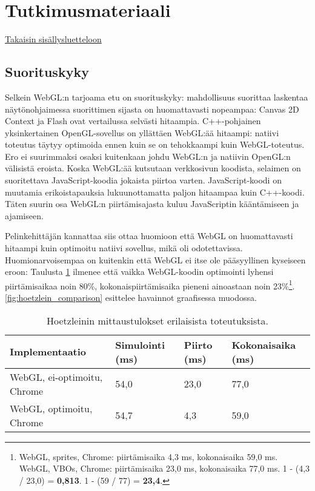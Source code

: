 \section{Tutkimusmateriaali}
\label{sec:materiaali}
\hyperlink{index}{Takaisin sisällysluetteloon}
\subsection{Suorituskyky}
Selkein WebGL:n tarjoama etu on suorituskyky: mahdollisuus suorittaa laskentaa näytönohjaimessa suorittimen sijasta on huomattavasti nopeampaa: Canvas 2D Context ja Flash ovat vertailussa selvästi hitaampia. C++-pohjainen yksinkertainen OpenGL-sovellus on yllättäen WebGL:ää hitaampi: natiivi toteutus täytyy optimoida ennen kuin se on tehokkaampi kuin WebGL-toteutus.\cite{hoetzlein} Ero ei suurimmaksi osaksi kuitenkaan johdu WebGL:n ja natiivin OpenGL:n välisistä eroista. Koska WebGL:ää kutsutaan verkkosivun koodista, selaimen on suoritettava JavaScript-koodia jokaista piirtoa varten. JavaScript-koodi on muutamia erikoistapauksia lukuunottamatta paljon hitaampaa kuin C++-koodi\cite{smedberg}. Täten suurin osa WebGL:n piirtämisajasta kuluu JavaScriptin kääntämiseen ja ajamiseen\cite{hoetzlein}.

Pelinkehittäjän kannattaa siis ottaa huomioon että WebGL on huomattavasti hitaampi kuin optimoitu natiivi sovellus, mikä oli odotettavissa. Huomionarvoisempaa on kuitenkin että WebGL ei itse ole pääsyyllinen kyseiseen eroon: Taulusta \ref{tab:hoetzlein_diff} ilmenee että vaikka WebGL-koodin optimointi lyhensi piirtämisaikaa noin 80\%, kokonaispiirtämisaika pieneni ainoastaan noin 23\%\footnote{WebGL, sprites, Chrome: piirtämisaika 4,3 ms, kokonaisaika 59,0 ms. WebGL, VBOs, Chrome: piirtämisaika 23,0 ms, kokonaisaika 77,0 ms. 1 - (4,3 / 23,0) = \textbf{0,813}. 1 - (59 / 77) = \textbf{23,4}.}. \autoref{fig:hoetzlein_comparison} esittelee havainnot graafisessa muodossa.

\begin{table}[h]
    \caption{\label{tab:hoetzlein_diff}Hoetzleinin\cite{hoetzlein} mittaustulokset erilaisista toteutuksista.}
    \begin{tabular}{|l|l|l|l|}
        \hline
        Implementaatio & Simulointi (ms) & Piirto (ms) & Kokonaisaika (ms) \\ \hline
        WebGL, ei-optimoitu, Chrome & 54,0 & 23,0 & 77,0 \\ \hline
        WebGL, optimoitu, Chrome & 54,7 & 4,3 & 59,0 \\ \hline
    \end{tabular}
\end{table}

